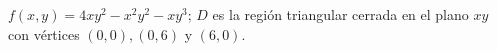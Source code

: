 \item $f(x, y) = 4xy^2 - x^2y^2 - xy^3$; $D$ es la región triangular cerrada en el plano $xy$ con vértices $(0, 0), (0, 6)$ y $(6, 0)$.
